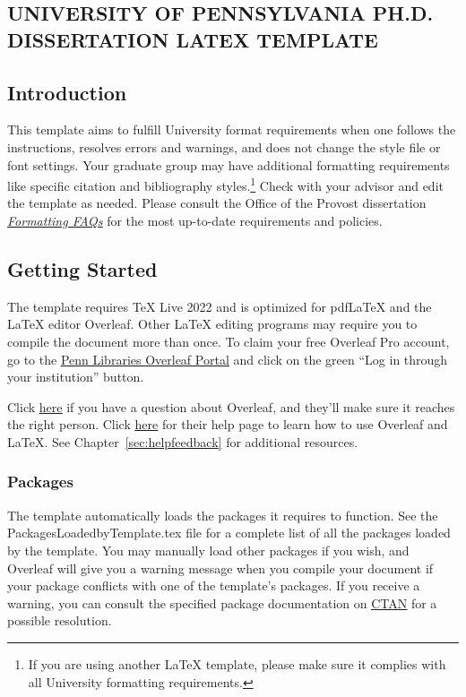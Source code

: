 \documentclass[11pt]{report}
\begin{document}
\begin{mainf} %
\chapter{UNIVERSITY OF PENNSYLVANIA PH.D. DISSERTATION LATEX TEMPLATE}
\section{Introduction}
This template aims to fulfill University format requirements when one follows the instructions, resolves errors and warnings, and does not change the style file or font settings. Your graduate group may have additional formatting requirements like specific citation and bibliography styles.\footnote{If you are using another LaTeX template, please make sure it complies with all University formatting requirements.} Check with your advisor and edit the template as needed. Please consult the Office of the Provost dissertation \textit{\underline{\href{https://provost.upenn.edu/formatting-faqs}{Formatting FAQs}}} for the most up-to-date requirements and policies.

\section{Getting Started}
The template requires TeX Live 2022 and is optimized for pdfLaTeX and the LaTeX editor Overleaf. Other LaTeX editing programs may require you to compile the document more than once. To claim your free Overleaf Pro account, go to the \underline{\href{https://www.overleaf.com/edu/upenn}{Penn Libraries Overleaf Portal}} and click on the green ``Log in through your institution'' button.

Click \underline{\href{https://www.overleaf.com/contact}{here}} if you have a question about Overleaf, and they'll make sure it reaches the right person. Click \underline{\href{https://www.overleaf.com/help/18-how-do-i-use-overleaf}{here}} for their help page to learn how to use Overleaf and LaTeX. See Chapter~\ref{sec:helpfeedback} for additional resources.

\subsection{Packages}
The template automatically loads the packages it requires to function. See the PackagesLoadedbyTemplate.tex file for a complete list of all the packages loaded by the template. You may manually load other packages if you wish, and Overleaf will give you a warning message when you compile your document if your package conflicts with one of the template's packages. If you receive a warning, you can consult the specified package documentation on \underline{\href{https://www.ctan.org}{CTAN}} for a possible resolution.
\newpage

\end{mainf}
\end{document}
